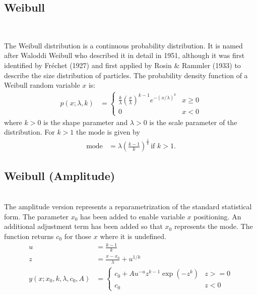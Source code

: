 \clearpage
\subsection{Weibull} ~\\
\label{sec:Weibull}

The Weibull distribution is a continuous probability distribution.
It is named after Waloddi Weibull who described it in detail in
1951, although it was first identified by Fr\'{e}chet (1927) and first
applied by Rosin \& Rammler (1933) to describe the size distribution
of particles. The probability density function of a Weibull random
variable $x$ is:
\begin{align}
p(x;\lambda,k) &=
    \begin{cases}
         \frac{k}{\lambda}\left(\frac{x}{\lambda}\right)^{k-1}e^{-(x/\lambda)^{k}} & x\geq0\\
         0 & x<0
    \end{cases}
\end{align}
where $k > 0$ is the shape parameter and $\lambda > 0$ is the scale parameter of the distribution.
For $k>1$ the $\mathrm{mode}$ is given by
\begin{align}
\mathrm{mode} &= \lambda \left(\frac{k-1}{k} \right)^{\frac{1}{k}}\, \mbox{if } k > 1.
\end{align}
\subsection{Weibull (Amplitude)} ~\\
\label{sec:WeibullAmplitude}
The amplitude version represents a reparametrization of the standard statistical
form. The parameter $x_0$ has been added to enable variable $x$ positioning. An
additional adjustment term has been added so that $x_0$ represents the mode.
The function returns $c_0$ for those $x$ where it is undefined.
\begin{align}
u & = \frac{k-1}{k} \nonumber \\
z & = \frac{x-x_0}{\lambda}+u^{1/k}  \nonumber \\
y(x;x_0,k,\lambda,c_0,A) &=
    \begin{cases}
        c_0 + A u^{-u} z^{k-1} \exp\left(-z^k\right) & z >= 0 \\
        c_0 & z<0
    \end{cases}
\end{align}


